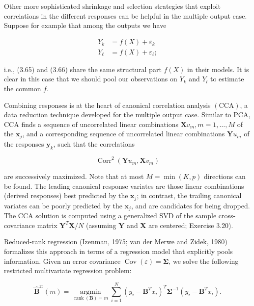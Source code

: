 \documentclass[10pt]{article}
\begin{document}
Other more sophisticated shrinkage and selection strategies that exploit correlations in the different responses can be helpful in the multiple output case. Suppose for example that among the outputs we have


\begin{align*}
Y_{k} & =f(X)+\varepsilon_{k}  \tag{3.65}\\
Y_{\ell} & =f(X)+\varepsilon_{\ell} ; \tag{3.66}
\end{align*}


i.e., (3.65) and (3.66) share the same structural part $f(X)$ in their models. It is clear in this case that we should pool our observations on $Y_{k}$ and $Y_{l}$ to estimate the common $f$.

Combining responses is at the heart of canonical correlation analysis $(\mathrm{CCA})$, a data reduction technique developed for the multiple output case. Similar to PCA, CCA finds a sequence of uncorrelated linear combinations $\mathbf{X} v_{m}, m=1, \ldots, M$ of the $\mathbf{x}_{j}$, and a corresponding sequence of uncorrelated linear combinations $\mathbf{Y} u_{m}$ of the responses $\mathbf{y}_{k}$, such that the correlations


\begin{equation*}
\operatorname{Corr}^{2}\left(\mathbf{Y} u_{m}, \mathbf{X} v_{m}\right) \tag{3.67}
\end{equation*}


are successively maximized. Note that at most $M=\min (K, p)$ directions can be found. The leading canonical response variates are those linear combinations (derived responses) best predicted by the $\mathbf{x}_{j}$; in contrast, the trailing canonical variates can be poorly predicted by the $\mathbf{x}_{j}$, and are candidates for being dropped. The CCA solution is computed using a generalized SVD of the sample cross-covariance matrix $\mathbf{Y}^{T} \mathbf{X} / N$ (assuming $\mathbf{Y}$ and $\mathbf{X}$ are centered; Exercise 3.20).

Reduced-rank regression (Izenman, 1975; van der Merwe and Zidek, 1980) formalizes this approach in terms of a regression model that explicitly pools information. Given an error covariance $\operatorname{Cov}(\varepsilon)=\boldsymbol{\Sigma}$, we solve the following\\
restricted multivariate regression problem:


\begin{equation*}
\hat{\mathbf{B}}^{\mathrm{rr}}(m)=\underset{\operatorname{rank}(\mathbf{B})=m}{\operatorname{argmin}} \sum_{i=1}^{N}\left(y_{i}-\mathbf{B}^{T} x_{i}\right)^{T} \boldsymbol{\Sigma}^{-1}\left(y_{i}-\mathbf{B}^{T} x_{i}\right) . \tag{3.68}
\end{equation*}
\end{document}

